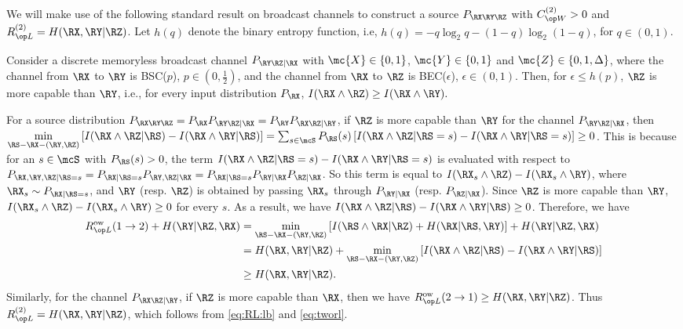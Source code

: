 We will make use of the following standard result on broadcast channels to construct a source $P_{\RX\RY\RZ}$ with $\wskc^{(2)}>0$ and $\rl^{(2)}=H(\RX, \RY | \RZ)$. Let $h(q)$ denote the binary entropy function, i.e, $h(q)= -q \log_2q-(1-q) \log_2(1-q)$, for $q \in (0,1)$.
 

\begin{lemma} \label{lem:bc_oneway}
    Consider a discrete memoryless broadcast channel $P_{\RY\RZ | \RX}$ with $\mc{X} \in \{0,1\}$, $\mc{Y} \in \{0,1\}$ and $\mc{Z} \in \{0,1,\Delta\}$, where the channel from $\RX$ to $\RY$ is BSC($p$), $p \in (0,\frac{1}{2})$, and the channel from $\RX$ to 
    $\RZ$ is BEC($\epsilon$),  $\epsilon \in (0,1)$.  Then, for $\epsilon \leq h(p)$,  $\RZ$ is more capable than $\RY$, i.e., for every input distribution $P_{\RX}$, $I(\RX\wedge\RZ) \geq I(\RX\wedge\RY).$
\end{lemma}

        

For a source distribution  $P_{\RX\RY\RZ}=P_{\RX}P_{\RY\RZ|\RX}=P_{\RY}P_{\RX\RZ|\RY} $, if $\RZ$ is more capable than $\RY$ for the channel $P_{\RY\RZ|\RX}$, then $\min\limits_{\RS-\RX-(\RY, \RZ)}\left[I(\RX \wedge \RZ | \RS) - I(\RX \wedge \RY | \RS)\right] =\sum_{s \in \mcS} P_{\RS}(s)\left[I(\RX \wedge \RZ | \RS=s) - I(\RX \wedge \RY | \RS=s)\right]\geq 0$. This is because for an $s \in \mcS$ with $P_{\RS}(s)>0$, the term $I(\RX \wedge \RZ | \RS=s) - I(\RX \wedge \RY | \RS=s)$ is evaluated with respect to $P_{\RX,\RY,\RZ | \RS=s} = P_{\RX | \RS=s}P_{\RY,\RZ | \RX}= P_{\RX | \RS=s}P_{\RY | \RX}P_{\RZ | \RX}$. So this term is equal to $I(\RX_s \wedge \RZ) - I(\RX_s \wedge \RY)$, where $\RX_s \sim P_{\RX | \RS=s}$, and $\RY$ (resp. $\RZ$) is obtained by passing $\RX_s$ through $P_{\RY|\RX}$ (resp. $P_{\RZ|\RX}$). Since $\RZ$ is more capable than $\RY$, $I(\RX_s \wedge \RZ) - I(\RX_s \wedge \RY)\geq 0$ for every $s$. As a result, we have $I(\RX \wedge \RZ | \RS) - I(\RX \wedge \RY | \RS) \geq 0$. Therefore, we have
\begin{align*}
    \rl^{\text{ow}} (1 \rightarrow 2)+ H(\RY | \RZ, \RX) &= \min\limits_{\RS-\RX-(\RY, \RZ)}\left[I(\RS \wedge \RX | \RZ)+H(\RX | \RS, \RY)\right]+ H(\RY | \RZ, \RX)\\
    &= H(\RX,\RY | \RZ) + \min\limits_{\RS-\RX-(\RY, \RZ)}\left[I(\RX \wedge \RZ | \RS) - I(\RX \wedge \RY | \RS)\right]\\
    &\geq H(\RX,\RY | \RZ).
\end{align*}
Similarly, for the channel $P_{\RX\RZ|\RY}$, if $\RZ$ is more capable than $\RX$, then we have $ \rl^{\text{ow}} (2 \rightarrow 1)\geq H(\RX,\RY | \RZ)$. Thus $\rl^{(2)} = H(\RX, \RY | \RZ)$, which follows from \eqref{eq:RL:lb} and \eqref{eq:tworl}. 

